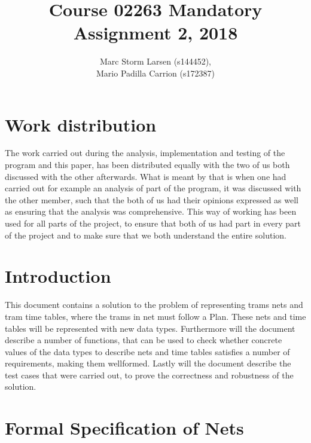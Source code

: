 \documentclass[a4]{article}
\title{Course 02263 Mandatory Assignment 2, 2018}
\author{Marc Storm Larsen (s144452),\\ 
        Mario Padilla Carrion (s172387)}
\begin{document}
\maketitle

\tableofcontents
\newpage

\section{Work distribution}
The work carried out during the analysis, implementation and testing of the program and this paper, has been distributed equally with the two of us both discussed with the other afterwards. What is meant by that is when one had carried out for example an analysis of part of the program, it was discussed with the other member, such that the both of us had their opinions expressed as well as ensuring that the analysis was comprehensive. This way of working has been used for all parts of the project, to ensure that both of us had part in every part of the project and to make sure that we both understand the entire solution.

\section{Introduction}
This document contains a solution to the problem of representing trams nets and tram time tables, where the trams in net must follow a Plan. These nets and time tables will be represented with new data types. Furthermore will the document describe a number of functions, that can be used to check whether concrete values of the data types to describe nets and time tables satisfies a number of requirements, making them wellformed. Lastly will the document describe the test cases that were carried out, to prove the correctness and robustness of the solution.

\section{Formal Specification of Nets}


\end{document}
